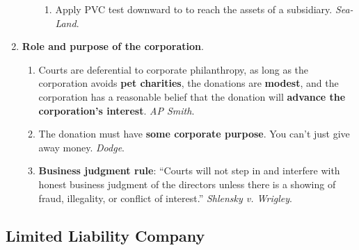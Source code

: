 \begin{enumerate}
\begin{enumerate}
\begin{enumerate}
            \item Apply PVC test downward to to reach the assets of a 
            subsidiary. \emph{Sea-Land}. %
        \end{enumerate}
    \end{enumerate}
    \item \textbf{Role and purpose of the corporation}.
    \begin{enumerate}
        \item Courts are deferential to corporate philanthropy, as long as the 
        corporation avoids \textbf{pet charities}, the donations are 
        \textbf{modest}, and the corporation has a reasonable belief that the 
        donation will \textbf{advance the corporation's interest}. \emph{AP 
        Smith}. %
        \item The donation must have \textbf{some corporate purpose}. You 
        can't just give away money. \emph{Dodge}. %
        \item \textbf{Business judgment rule}: ``Courts will not step 
        in and interfere with honest business judgment of the directors unless 
        there is a showing of fraud, illegality, or conflict of interest.'' 
        \emph{Shlensky v. Wrigley}. %
    \end{enumerate}
\end{enumerate}



\newpage

\subsection{Limited Liability Company}


